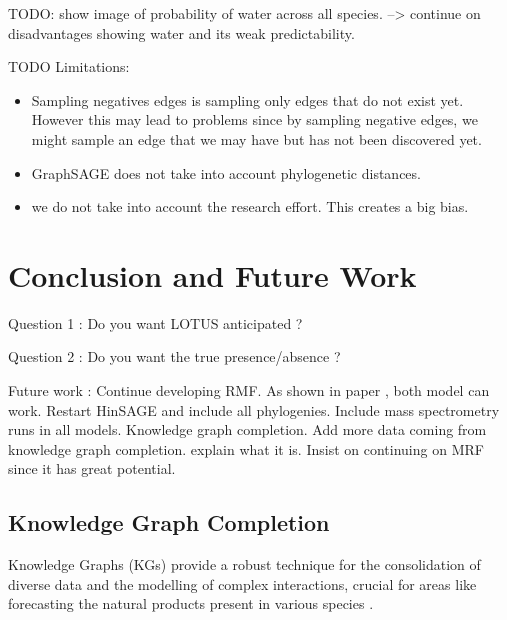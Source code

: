 \documentclass[
11pt, %
oneside, %
english, %
singlespacing, %
headsepline, %
chapterinoneline, %
]{MastersDoctoralThesis} %
\begin{document}
TODO: show image of probability of water across all species. --> continue on disadvantages showing water and its weak predictability. 



TODO Limitations: 
\begin{itemize}
	\item  Sampling negatives edges is sampling only edges that do not exist yet. However this may lead to problems since by sampling negative edges, we might sample an edge that we may have but has not been discovered yet. 
	\item GraphSAGE does not take into account phylogenetic distances. 
	\item we do not take into account the research effort. This creates a big bias.
\end{itemize}









\chapter{Conclusion and Future Work}
Question 1 : Do you want LOTUS anticipated ? 

Question 2 : Do you want the true presence/absence ?


Future work : Continue developing RMF. As shown in paper \cite{jiaGraphBeliefPropagation2021}, both model can work. Restart HinSAGE and include all phylogenies. Include mass spectrometry runs in all models. Knowledge graph completion. Add more data coming from knowledge graph completion. explain what it is. Insist on continuing on MRF since it has great potential. 

\section{Knowledge Graph Completion}
Knowledge Graphs (KGs) provide a robust technique for the consolidation of diverse data and the modelling of complex interactions, crucial for areas like forecasting the natural products present in various species \cite{ehrlingerDefinitionKnowledgeGraphs2016}. 
\end{document}

